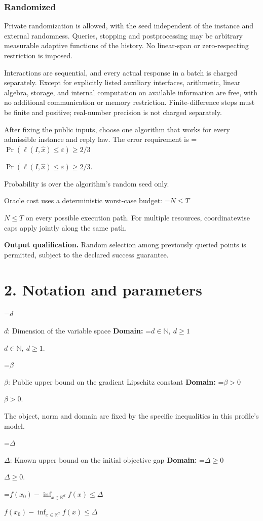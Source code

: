 \documentclass[10pt,a4paper]{article}
\newcommand{\AtlasMath}[1]{\par\begingroup\centering\setbox0=\hbox{$\displaystyle #1$}\ifdim\wd0>1.4\linewidth\typeout{ATLAS WIDE FORMULA: \the\wd0}\fi\ifdim\wd0>\linewidth\resizebox{\linewidth}{!}{\box0}\else\box0\fi\par\endgroup}
\newcommand{\AtlasInlineMath}[1]{\begingroup\setbox0=\hbox{$#1$}\ifdim\wd0>.4\linewidth\endgroup\AtlasMath{#1}\else\endgroup$#1$\fi}
\begin{document}
\subsubsection{Randomized}
Private randomization is allowed, with the seed independent of the instance and external randomness. Queries, stopping and postprocessing may be arbitrary measurable adaptive functions of the history. No linear-span or zero-respecting restriction is imposed.

Interactions are sequential, and every actual response in a batch is charged separately. Except for explicitly listed auxiliary interfaces, arithmetic, linear algebra, storage, and internal computation on available information are free, with no additional communication or memory restriction. Finite-difference steps must be finite and positive; real-number precision is not charged separately.

After fixing the public inputs, choose one algorithm that works for every admissible instance and reply law. The error requirement is \AtlasInlineMath{\Pr(\ell(I,\widehat{x})\le \varepsilon)\ge2/3}.

Probability is over the algorithm's random seed only.

Oracle cost uses a deterministic worst-case budget: \AtlasInlineMath{N\le T} on every possible execution path. For multiple resources, coordinatewise caps apply jointly along the same path.

\textbf{Output qualification.} Random selection among previously queried points is permitted, subject to the declared success guarantee.

\section{2. Notation and parameters}
\AtlasInlineMath{d}: Dimension of the variable space \textbf{Domain:} \AtlasInlineMath{d\in\mathbb{N},\ d\ge1}.

\AtlasInlineMath{\beta}: Public upper bound on the gradient Lipschitz constant \textbf{Domain:} \AtlasInlineMath{\beta>0}.

The object, norm and domain are fixed by the specific inequalities in this profile's model.

\AtlasInlineMath{\Delta}: Known upper bound on the initial objective gap \textbf{Domain:} \AtlasInlineMath{\Delta\ge0}.

\AtlasInlineMath{f(x_0)-\inf_{x\in\mathbb{R}^d}f(x)\le\Delta}
\end{document}
